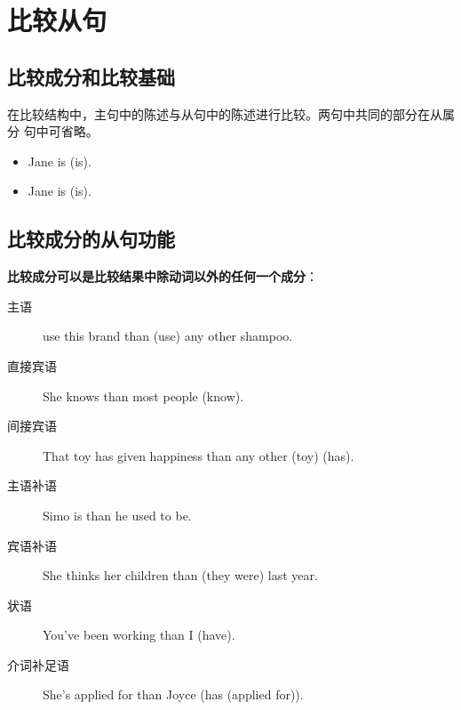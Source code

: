 

\chapter{比较从句}

\section{比较成分和比较基础}

在比较结构中，主句中的陈述与从句中的陈述进行比较。两句中共同的部分在从属分
句中可省略。
\begin{itemize}
\item Jane is     (is).
\item Jane is    (is).
\end{itemize}

\section{比较成分的从句功能}

\textbf{比较成分可以是比较结果中除动词以外的任何一个成分}：
\begin{description}
\item[主语]  use this brand than (use) any other shampoo.

\item[直接宾语] She knows  than most people (know).

\item[间接宾语] That toy has given  happiness than any other (toy) (has).

\item[主语补语] Simo is  than he used to be.

\item[宾语补语] She thinks her children  than (they were) last year.
\item[状语] You've been working  than I (have).

\item[介词补足语] She's applied for  than Joyce (has (applied for)).
\end{description}

